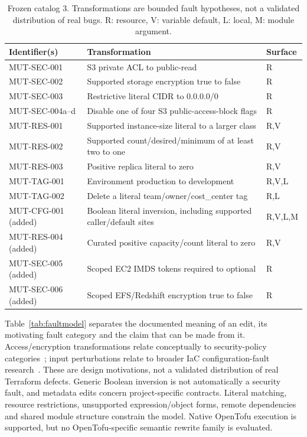 \begin{table}[ht]
\caption{Frozen catalog 3. Transformations are bounded fault hypotheses, not a validated distribution of real bugs. R: resource, V: variable default, L: local, M: module argument.}\label{tab:operators}
\small\begin{tabularx}{\linewidth}{@{}p{3.05 cm}X p{1.3 cm}@{}}\toprule
Identifier(s) & Transformation & Surface\\\midrule
MUT-SEC-001 & S3 private ACL to public-read & R\\
MUT-SEC-002 & Supported storage encryption true to false & R\\
MUT-SEC-003 & Restrictive literal CIDR to 0.0.0.0/0 & R\\
MUT-SEC-004a--d & Disable one of four S3 public-access-block flags & R\\
MUT-RES-001 & Supported instance-size literal to a larger class & R,V\\
MUT-RES-002 & Supported count/desired/minimum of at least two to one & R,V\\
MUT-RES-003 & Positive replica literal to zero & R,V\\
MUT-TAG-001 & Environment production to development & R,V,L\\
MUT-TAG-002 & Delete a literal team/owner/cost\_center tag & R,L\\\midrule
MUT-CFG-001 (added) & Boolean literal inversion, including supported caller/default sites & R,V,L,M\\
MUT-RES-004 (added) & Curated positive capacity/count literal to zero & R,V\\
MUT-SEC-005 (added) & Scoped EC2 IMDS tokens required to optional & R\\
MUT-SEC-006 (added) & Scoped EFS/Redshift encryption true to false & R\\\bottomrule
\end{tabularx}\end{table}

Table~\ref{tab:faultmodel} separates the documented meaning of an edit, its motivating fault category and the claim that can be made from it. Access/encryption transformations relate conceptually to security-policy categories~\cite{verdet}; input perturbations relate to broader IaC configuration-fault research~\cite{drosos}. These are design motivations, not a validated distribution of real Terraform defects. Generic Boolean inversion is not automatically a security fault, and metadata edits concern project-specific contracts. Literal matching, resource restrictions, unsupported expression/object forms, remote dependencies and shared module structure constrain the model. Native OpenTofu execution is supported, but no OpenTofu-specific semantic rewrite family is evaluated.


